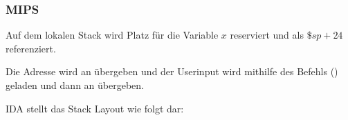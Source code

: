 \subsubsection{MIPS}
Auf dem lokalen Stack wird Platz für die Variable $x$ reserviert und als $\$sp+24$ referenziert.

Die Adresse wird an \scanf übergeben und der Userinput wird mithilfe des Befehls  () geladen und dann an \printf übergeben.



IDA stellt das Stack Layout wie folgt dar:



